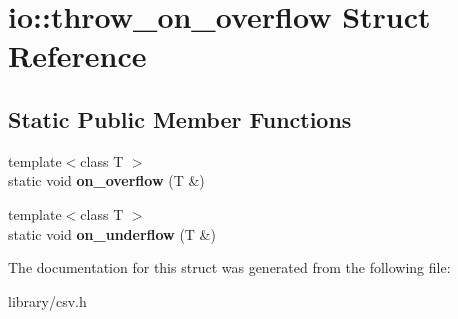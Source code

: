 \hypertarget{structio_1_1throw__on__overflow}{}\section{io\+:\+:throw\+\_\+on\+\_\+overflow Struct Reference}
\label{structio_1_1throw__on__overflow}
\subsection*{Static Public Member Functions}
\begin{DoxyCompactItemize}
\item 
\mbox{\label{structio_1_1throw__on__overflow_a0a59c1dc2ead1a9275c62885ec7545d2}} 
{\footnotesize template$<$class T $>$ }\\static void {\bfseries on\+\_\+overflow} (T \&)
\item 
\mbox{\label{structio_1_1throw__on__overflow_a2ae91b1ae3d655c16f7e6a7e9a1abd92}} 
{\footnotesize template$<$class T $>$ }\\static void {\bfseries on\+\_\+underflow} (T \&)
\end{DoxyCompactItemize}


The documentation for this struct was generated from the following file\+:\begin{DoxyCompactItemize}
\item 
library/csv.\+h\end{DoxyCompactItemize}
